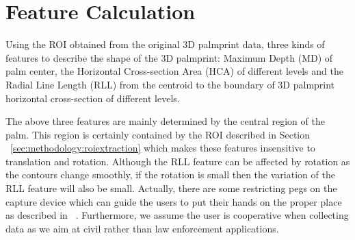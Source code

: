 \section{Feature Calculation}
\label{sec:methodology:featurecalc}

Using the ROI obtained from the original 3D palmprint data, three kinds of features to describe the shape of the 3D palmprint: Maximum Depth (MD) of palm center, the Horizontal Cross-section Area (HCA) of different levels and the Radial Line Length (RLL) from the centroid to the boundary of 3D palmprint horizontal cross-section of different levels.





The above three features are mainly determined by the central region of the palm. This region is certainly contained by the ROI described in Section ~\ref{sec:methodology:roiextraction} which makes these features insensitive to translation and rotation. Although the RLL feature can be affected by rotation as the contours change smoothly, if the rotation is small then the variation of the RLL feature will also be small. Actually, there are some restricting pegs on the capture device which can guide the users to put their hands on the proper place as described in ~\cite{Zhang:2009dp}. Furthermore, we assume the user is cooperative when collecting data as we aim at civil rather than law enforcement applications.
